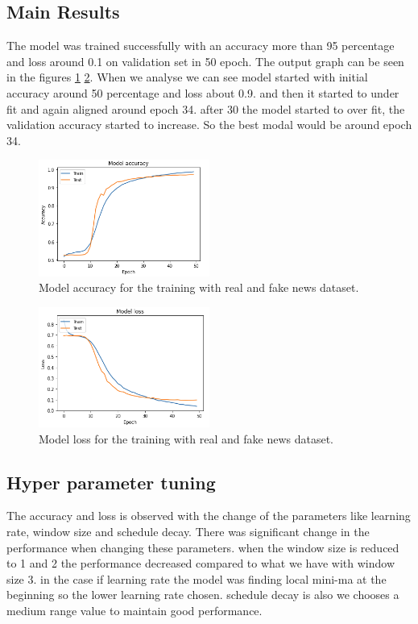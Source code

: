 \documentclass{MX2020}
\begin{document}
\subsection{Main Results}
The model was trained successfully with an accuracy more than 95 percentage and loss around 0.1 on validation set  in 50 epoch. The output graph can be seen in the figures \ref{fig:accuracy} \ref{fig:loss}. When we analyse we can see model started with initial accuracy around 50 percentage and loss about 0.9. and then it started to under fit and again aligned around epoch 34. after 30 the model started to over fit, the validation accuracy started to increase. So the best modal would be around epoch 34.
\begin{figure}[h]
    \centering
    \includegraphics[width=0.5\textwidth]{accuracy.png}
    \caption{Model accuracy for the training with real and fake news dataset.}
    \label{fig:accuracy}
\end{figure}
\begin{figure}[h]
    \centering
    \includegraphics[width=0.5\textwidth]{loss.png}
    \caption{Model loss for the training with real and fake news dataset.}
    \label{fig:loss}
\end{figure}
\subsection{Hyper parameter tuning}
The accuracy and loss is observed with the change of the parameters like learning rate, window size and schedule decay.  There was significant change in the performance 
when changing these parameters. when the window size is reduced to 1 and 2 the performance decreased compared to what we have with window size 3. in the case if learning rate the model was finding local mini-ma at the beginning so the lower learning rate chosen. schedule decay is also we chooses a medium range value to maintain good performance.
\end{document}
